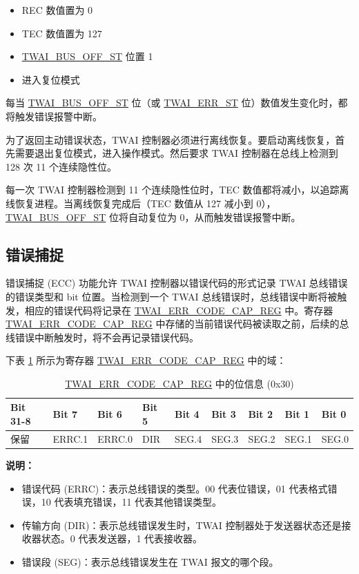 \documentclass[main\_\_CN.tex]{subfiles}
\begin{document}
\begin{itemize}
    \item REC 数值置为 0
    \item TEC 数值置为 127
    \item \hyperref[fielddesc:TWAIBUSOFFST]{TWAI\_BUS\_OFF\_ST} 位置 1
    \item 进入复位模式
\end{itemize}

每当 \hyperref[fielddesc:TWAIBUSOFFST]{TWAI\_BUS\_OFF\_ST} 位（或 \hyperref[fielddesc:TWAIERRST]{TWAI\_ERR\_ST} 位）数值发生变化时，都将触发错误报警中断。

为了返回主动错误状态，TWAI 控制器必须进行离线恢复。要启动离线恢复，首先需要退出复位模式，进入操作模式。然后要求 TWAI 控制器在总线上检测到 128 次 11 个连续隐性位。

每一次 TWAI 控制器检测到 11 个连续隐性位时，TEC 数值都将减小，以追踪离线恢复进程。当离线恢复完成后（TEC 数值从 127 减小到 0），\hyperref[fielddesc:TWAIBUSOFFST]{TWAI\_BUS\_OFF\_ST} 位将自动复位为 0，从而触发错误报警中断。

\subsection{错误捕捉}

错误捕捉 (ECC) 功能允许 TWAI 控制器以错误代码的形式记录 TWAI 总线错误的错误类型和 bit 位置。当检测到一个 TWAI 总线错误时，总线错误中断将被触发，相应的错误代码将记录在 \hyperref[regdesc:TWAIERRCODECAPREG]{TWAI\_ERR\_CODE\_CAP\_REG} 中。寄存器 \hyperref[regdesc:TWAIERRCODECAPREG]{TWAI\_ERR\_CODE\_CAP\_REG} 中存储的当前错误代码被读取之前，后续的总线错误中断触发时，将不会再记录错误代码。

下表 \ref{tab:twai-bit-info-error-code-cap-reg} 所示为寄存器 \hyperref[regdesc:TWAIERRCODECAPREG]{TWAI\_ERR\_CODE\_CAP\_REG} 中的域：

\begin{longtable}[c]{|p{1.4cm}|p{1.4cm}|p{1.4cm}|p{1.4cm}|p{1.4cm}|p{1.4cm}|p{1.4cm}|p{1.4cm}|p{1.4cm}|}
    \caption{\hyperref[regdesc:TWAIERRCODECAPREG]{TWAI\_ERR\_CODE\_CAP\_REG} 中的位信息 (0x30)}
    \label{tab:twai-bit-info-error-code-cap-reg}\\
    \hline
    \rowcolor{lightgray}
    \textbf{Bit 31-8} & \textbf{Bit 7} & \textbf{Bit 6} & \textbf{Bit 5} & \textbf{Bit 4} & \textbf{Bit 3} & \textbf{Bit 2} & \textbf{Bit 1} & \textbf{Bit 0}\\\hline
    保留 & ERRC.1 & ERRC.0 & DIR & SEG.4 & SEG.3 & SEG.2 & SEG.1 & SEG.0\\
    \hline
\end{longtable}
\vspace{-1.5em}
{\bfseries 说明：}\\
\begin{itemize}
    \item 错误代码 (ERRC)：表示总线错误的类型。00 代表位错误，01 代表格式错误，10 代表填充错误，11 代表其他错误类型。
    \item 传输方向 (DIR)：表示总线错误发生时，TWAI 控制器处于发送器状态还是接收器状态。0 代表发送器，1 代表接收器。
    \item 错误段 (SEG)：表示总线错误发生在 TWAI 报文的哪个段。
\end{itemize}
\end{document}
